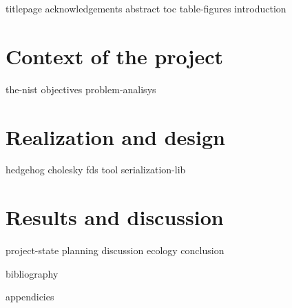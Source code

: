 \documentclass[12pt]{article}
\begin{document}
    {titlepage}
    {acknowledgements}
    {abstract}
    {toc}
    {table-figures}
    {introduction}


    \clearpage{}
    \part{Context of the project}

    {the-nist}
    {objectives}
    {problem-analisys}

    \clearpage{}
    \part{Realization and design}

    {hedgehog}
    {cholesky}
    {fds}
    {tool}
    {serialization-lib}

    \clearpage{}
    \part{Results and discussion}

    {project-state}
    {planning}
    {discussion}
    {ecology}
    {conclusion}


    {bibliography}

    \clearpage{}
    \printglossaries

    {appendicies}
\end{document}
